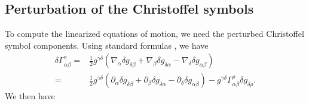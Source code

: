 \documentclass[12pt]{report}
\begin{document}
\subsection{Perturbation of the Christoffel symbols}
To compute the linearized equations of motion, we need
the perturbed Christoffel symbol components.
Using standard formulas \cite{Wald:1984rg}, we have
\begin{align}
    \delta \Gamma^{\gamma}_{\alpha\beta}
    =&
    \frac{1}{2}g^{\gamma\delta}\left(
        \nabla_{\alpha}\delta g_{\delta\beta}
        +
        \nabla_{\beta}\delta g_{\delta\alpha}
        -
        \nabla_{\delta}\delta g_{\alpha\beta}
    \right)
    \nonumber\\
    =&
    \frac{1}{2}g^{\gamma\delta}\left(
        \partial_{\alpha}\delta g_{\delta\beta}
        +
        \partial_{\beta}\delta g_{\delta\alpha}
        -
        \partial_{\delta}\delta g_{\alpha\beta}
    \right)
    -
    g^{\gamma\delta}\Gamma^{\rho}_{\alpha\beta}
    \delta g_{\delta\rho}
    .
\end{align}
We then have
\end{document}
